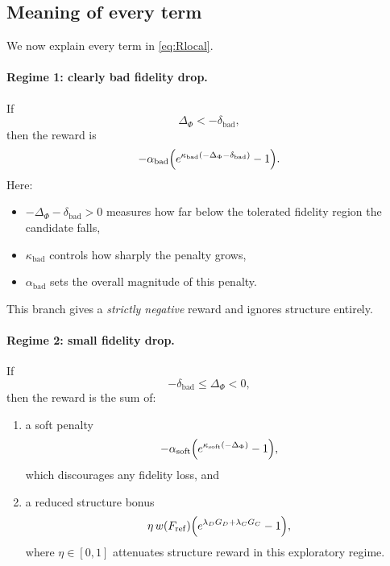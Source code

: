\documentclass[11pt]{article}
\begin{document}
\subsection{Meaning of every term}

We now explain every term in \eqref{eq:Rlocal}.

\paragraph{Regime 1: clearly bad fidelity drop.}
If
\begin{equation}
    \Delta_{\Phi}< -\delta_{\mathrm{bad}},
\end{equation}
then the reward is
\begin{equation}
    -\alpha_{\mathrm{bad}}\Bigl(e^{\kappa_{\mathrm{bad}}(-\Delta_{\Phi}-\delta_{\mathrm{bad}})}-1\Bigr).
\end{equation}
Here:
\begin{itemize}
    \item $-\Delta_{\Phi}-\delta_{\mathrm{bad}}>0$ measures how far below the tolerated fidelity region the candidate falls,
    \item $\kappa_{\mathrm{bad}}$ controls how sharply the penalty grows,
    \item $\alpha_{\mathrm{bad}}$ sets the overall magnitude of this penalty.
\end{itemize}
This branch gives a \emph{strictly negative} reward and ignores structure entirely.

\paragraph{Regime 2: small fidelity drop.}
If
\begin{equation}
    -\delta_{\mathrm{bad}}\le \Delta_{\Phi}<0,
\end{equation}
then the reward is the sum of:
\begin{enumerate}[label=(\alph*)]
    \item a soft penalty
    \begin{equation}
        -\alpha_{\mathrm{soft}}\Bigl(e^{\kappa_{\mathrm{soft}}(-\Delta_{\Phi})}-1\Bigr),
    \end{equation}
    which discourages any fidelity loss, and
    \item a reduced structure bonus
    \begin{equation}
        \eta\,w(F_{\mathrm{ref}})\Bigl(e^{\lambda_D G_D+\lambda_C G_C}-1\Bigr),
    \end{equation}
    where $\eta\in[0,1]$ attenuates structure reward in this exploratory regime.
\end{enumerate}
\end{document}

